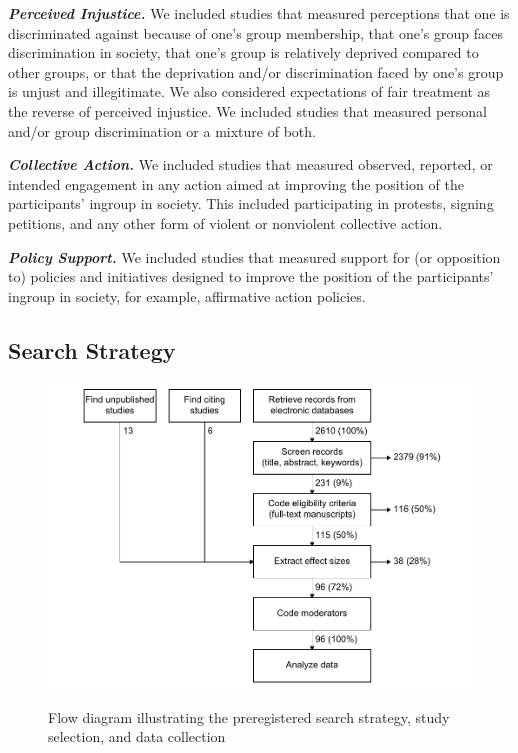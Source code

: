 \documentclass[twocolumn, 11pt, letterpaper]{article}
\begin{document}
\textbf{\emph{Perceived Injustice.}} We included studies that measured
perceptions that one is discriminated against because of one's group
membership, that one's group faces discrimination in society, that one's
group is relatively deprived compared to other groups, or that the
deprivation and/or discrimination faced by one's group is unjust and
illegitimate. We also considered expectations of fair treatment as the
reverse of perceived injustice. We included studies that measured
personal and/or group discrimination or a mixture of both.

\textbf{\emph{Collective Action.}} We included studies that measured
observed, reported, or intended engagement in any action aimed at
improving the position of the participants' ingroup in society. This
included participating in protests, signing petitions, and any other
form of violent or nonviolent collective action.

\textbf{\emph{Policy Support.}} We included studies that measured
support for (or opposition to) policies and initiatives designed to
improve the position of the participants' ingroup in society, for
example, affirmative action policies.

\hypertarget{search-strategy}{%
\subsection{Search Strategy}\label{search-strategy}}

\begin{figure}[t!]
\centering
\caption{Flow diagram illustrating the preregistered search strategy, study selection, and data collection}
\includegraphics[scale=1]{../figures/figure-1}
\label{fig:f1}
\end{figure}
\end{document}
